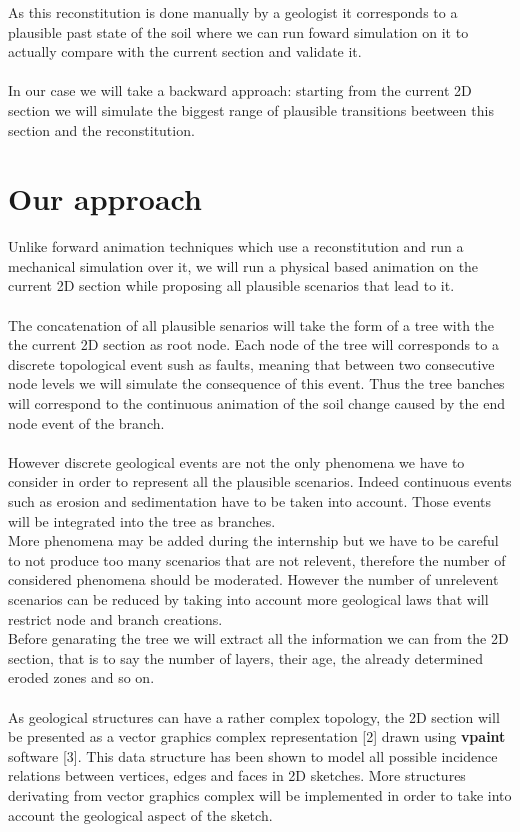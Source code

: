 \documentclass[a4paper,11pt]{article}
\begin{document}
As this reconstitution is done manually by a geologist it corresponds to a plausible past state of the soil where we can run foward simulation on it to actually compare with the current section and validate it. \\\\
In our case we will take a backward approach: starting from the current 2D section we will simulate the biggest range of plausible transitions beetween this section and the reconstitution.

\section{Our approach}

Unlike forward animation techniques which use a reconstitution and run a mechanical simulation over it, we will run a physical based animation on the current 2D section while proposing all plausible scenarios that lead to it. \\\\
The concatenation of all plausible senarios will take the form of a tree with the the current 2D section as root node.
Each node of the tree will corresponds to a discrete topological event sush as faults, meaning that between two consecutive node levels we will simulate the consequence of this event. Thus the tree banches will correspond to the continuous animation of the soil change caused by the end node event of the branch. \\\\
However discrete geological events are not the only phenomena we have to consider in order to represent all the plausible scenarios. Indeed continuous events such as erosion and sedimentation have to be taken into account. Those events will be integrated into the tree as branches.\\
More phenomena may be added during the internship but we have to be careful to not produce too many scenarios that are not relevent, therefore the number of considered phenomena should be moderated.
However the number of unrelevent scenarios can be reduced by taking into account more geological laws that will restrict node and branch creations.\\
Before genarating the tree we will extract all the information we can from the 2D section, that is to say the number of layers, their age, the already determined eroded zones and so on.\\\\
As geological structures can have a rather complex topology, the 2D section will be presented as a vector graphics complex representation [2] drawn using \textbf{vpaint} software [3]. This data structure has been shown to model all possible incidence relations between vertices, edges and faces in 2D sketches. More structures derivating from vector graphics complex will be implemented in order to take into account the geological aspect of the sketch.\\\\
\end{document}
